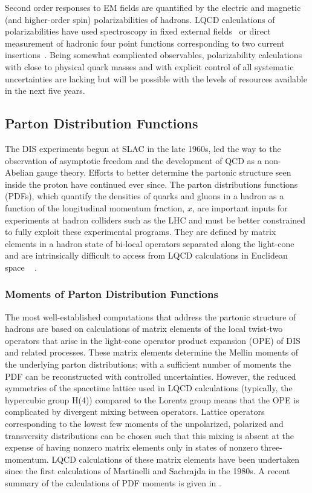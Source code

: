 Second order responses to EM fields are quantified by the electric and magnetic (and higher-order spin) polarizabilities of hadrons. LQCD calculations of polarizabilities have used spectroscopy in fixed external fields~\cite{Savage:2016kon,Shanahan:2017bgi,Tiburzi:2017iux} or direct measurement of hadronic four point functions corresponding to two current insertions~\cite{Engelhardt:2007ub}. Being somewhat complicated observables, polarizability calculations with close to physical quark masses and with explicit control of all systematic uncertainties are lacking but will be possible with the levels of resources available in the next five years.

\subsection{Parton Distribution Functions}


The DIS experiments begun at SLAC in the late 1960s, led the way to the observation of asymptotic freedom and the development of QCD as a non-Abelian gauge theory. Efforts to better determine the partonic structure seen inside the proton have continued ever since. The parton distributions functions (PDFs), which quantify the densities of quarks and gluons in a hadron as a function of the longitudinal momentum fraction, $x$, are important inputs for experiments at hadron colliders such as the LHC and must be better constrained to fully exploit these experimental programs.
They  are defined by matrix elements in a hadron state of bi-local operators separated along the light-cone and are intrinsically difficult to access from LQCD calculations in Euclidean space ~\cite{Collins:1981uw,Curci:1980uw,Baulieu:1979mr,Collins:1989gx} .


\subsubsection{Moments of Parton Distribution Functions}

The most well-established computations that address the partonic structure of hadrons are based on calculations of matrix elements of the local twist-two operators that arise in the light-cone operator product expansion (OPE) of DIS and related processes. These matrix elements determine the Mellin moments of the underlying parton distributions; with  a sufficient number of moments the PDF can be reconstructed with controlled uncertainties. However, the reduced symmetries of the spacetime lattice used in LQCD calculations (typically, the hypercubic group H(4)) compared to the Lorentz group means that the OPE is complicated by divergent mixing between operators.
Lattice operators corresponding to the lowest few moments of the unpolarized, polarized and transversity distributions can be chosen such that this mixing is absent at the expense of having nonzero matrix elements only in states of nonzero three-momentum. LQCD calculations of these matrix elements have been undertaken since the first calculations of Martinelli and Sachrajda \cite{Dawson:1997ic} in the 1980s. A recent summary of the calculations of PDF moments is given in \cite{Lin:2017snn}.
	
